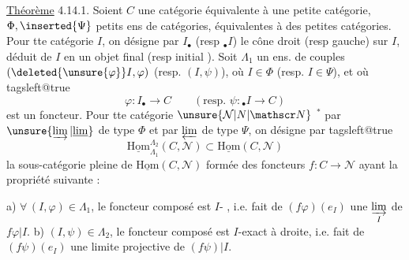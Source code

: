 \uline{Théorème} 4.14.1. Soient $C$ une catégorie équivalente à une petite catégorie, $\Phi,\inserted{\Psi}$  petits ens de  catégories,  équivalentes à des petites catégories. Pour tte catégorie $I$, on désigne par $I_\bullet$ (resp $ {}_\bullet I$) le cône droit (resp gauche) sur $I$, déduit de $I$ en  un objet final  (resp initial ). Soit $\Lambda_1$  un ens. de couples $(\deleted{\unsure{\varphi}}I,\varphi)$ (resp. $(I,\psi)$), où $I\in\Phi$ (resp. $I\in\Psi$), et où
\begingroup\csname tagsleft@true\endcsname\[
\varphi:I_{\bullet}\longrightarrow C\qquad(\text{resp. }\psi:{}_\bullet I\longrightarrow C)
\tag*{(4.14.1.1)}
\]\endgroup
est un foncteur. Pour tte catégorie $\unsure{\mathcal N|N|\mathscr N}$ $^*$ par $\unsure{\varinjlim|\underline{\lim}}$ de type $\Phi$ et par $\varprojlim$ de type $\Psi$, on désigne par
\begingroup\csname tagsleft@true\endcsname\[
\underline{\mathrm{Hom}}_{\Lambda_1}^{\Lambda_2}(C,\mathcal N)
\subset\underline{\mathrm{Hom}}(C,\mathcal N)
\tag*{(4.14.1.2)}
\]\endgroup
la sous-catégorie  pleine de $\underline{\mathrm{Hom}}(C,\mathcal N)$ formée des foncteurs $f:C\longrightarrow\mathcal N$  ayant la propriété suivante :

a) $\forall\,(I,\varphi)\in\Lambda_1$, le foncteur composé
est $I$- , i.e. fait de $(f\varphi)(e_I)$ une $\underset{I}{\varinjlim}$ de $f\varphi|I$.
b)  $(I,\psi)\in\Lambda_2$, le foncteur composé
est $I$-exact à droite, i.e. fait de $(f\psi)(e_I)$ une limite projective de $(f\psi)|I$.

